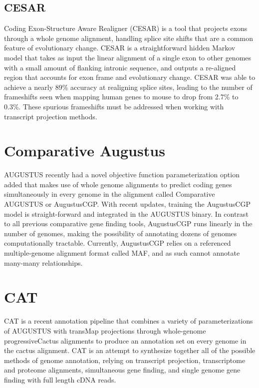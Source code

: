 \documentclass[fleqn,10pt]{wlscirep}
\begin{document}
\subsection{CESAR}
Coding Exon-Structure Aware Realigner (CESAR) \cite{sharma2016coding} is a tool that projects exons through a whole genome alignment, handling splice site shifts that are a common feature of evolutionary change. CESAR is a straightforward hidden Markov model that takes as input the linear alignment of a single exon to other genomes with a small amount of flanking intronic sequence, and outputs a re-aligned region that accounts for exon frame and evolutionary change. CESAR was able to achieve a nearly 89\% accuracy at realigning splice sites, leading to the number of frameshifts seen when mapping human genes to mouse to drop from 2.7\% to 0.3\%. These spurious frameshifts must be addressed when working with transcript projection methods.

\section{Comparative Augustus}
AUGUSTUS recently had a novel objective function parameterization option added that makes use of whole genome alignments to predict coding genes simultaneously in every genome in the alignment \cite{konig2015simultaneous} called Comparative AUGUSTUS or AugustusCGP. With recent updates, training the AugustusCGP model is straight-forward and integrated in the AUGUSTUS binary. In contrast to all previous comparative gene finding tools, AugustusCGP runs linearly in the number of genomes, making the possibility of annotating dozens of genomes computationally tractable. Currently, AugustusCGP relies on a referenced multiple-genome alignment format called MAF, and as such cannot annotate many-many relationships.

\section{CAT}
CAT is a recent annotation pipeline that combines a variety of parameterizations of AUGUSTUS with transMap projections through whole-genome progressiveCactus alignments to produce an annotation set on every genome in the cactus alignment. CAT is an attempt to synthesize together all of the possible methods of genome annotation, relying on transcript projection, transcriptome and proteome alignments, simultaneous gene finding, and single genome gene finding with full length cDNA reads. 
\end{document}
